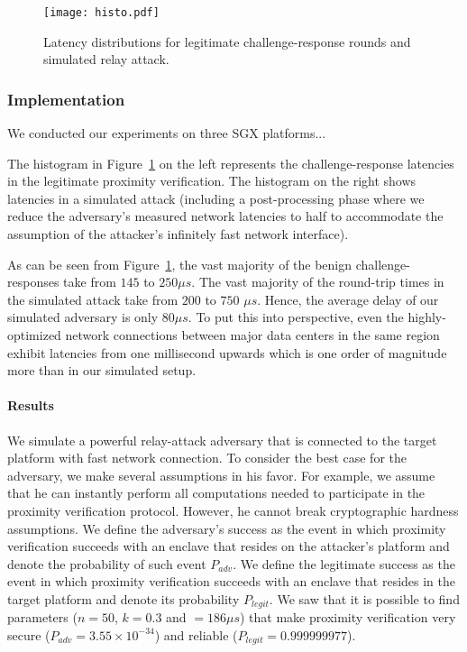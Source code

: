 \begin{figure}[t]
  \centering
    \texttt{[image: histo.pdf]} 
    \caption{Latency distributions for legitimate challenge-response rounds and simulated relay attack.}
    \label{graph:instatAttackerHisto}
\end{figure}


\subsubsection*{Implementation}

We conducted our experiments on three SGX platforms...

The histogram in Figure~\ref{graph:instatAttackerHisto} on the left represents the challenge-response latencies in the legitimate proximity verification. The histogram on the right shows latencies in a simulated attack (including a post-processing phase where we reduce the adversary's measured network latencies to half to accommodate the assumption of the attacker's infinitely fast network interface).

As can be seen from Figure~\ref{graph:instatAttackerHisto}, the vast majority of the benign challenge-responses take from $145$ to $250 \mu s$. The vast majority of the round-trip times in the simulated attack take from $200$ to $750$ $\mu s$. Hence, the average delay of our simulated adversary is only $80 \mu s$. To put this into perspective, even the highly-optimized network connections between major data centers in the same region exhibit latencies from one millisecond upwards which is one order of magnitude more than in our simulated setup.

\paragraph{Results} We simulate a powerful relay-attack adversary that is connected to the target platform with fast network connection. To consider the best case for the adversary, we make several assumptions in his favor. For example, we assume that he can instantly perform all computations needed to participate in the proximity verification protocol. However, he cannot break cryptographic hardness assumptions. We define the adversary's success as the event in which proximity verification succeeds with an enclave that resides on the attacker's platform and denote the probability of such event $P_{adv}$. We define the legitimate success as the event in which proximity verification succeeds with an enclave that resides in the target platform and denote its probability $P_{legit}$. We saw that it is possible to find parameters ($n=50$, $k=0.3$ and \connect$=186 \mu s$) that make proximity verification very secure ($P_{adv}=3.55\times 10^{-34}$) and reliable ($P_{legit}=0.999999977$).




